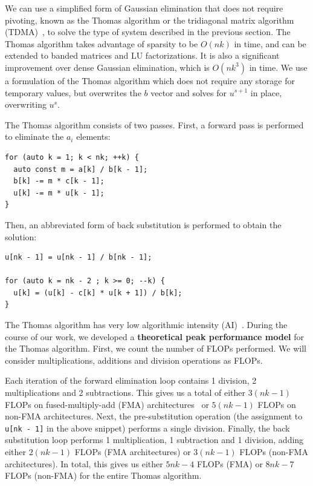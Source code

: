 \documentclass[10pt, conference, compsocconf]{IEEEtran}
\begin{document}
We can use a simplified form of Gaussian elimination that does not require
  pivoting, known as the Thomas algorithm or the tridiagonal matrix algorithm
  (TDMA)~\cite{elem_numerical_analysis_conte,numerical_math_quarteroni}, to
  solve the type of system described in the previous section.
The Thomas algorithm takes advantage of sparsity to be \(O(nk)\) in time, 
  and can be extended to banded matrices and LU factorizations.
It is also a significant improvement over dense Gaussian elimination,
  which is \(O(nk^3)\) in time. 
We use a formulation of the Thomas algorithm which does not require any storage
  for temporary values, but overwrites the \(b\) vector and solves for
  \(u^{s+1}\) in place, overwriting \(u^{s}\).

The Thomas algorithm consists of two passes.  First, a forward pass is
  performed to eliminate the \(a_i\) elements:
\begin{lstlisting}
for (auto k = 1; k < nk; ++k) {
  auto const m = a[k] / b[k - 1];
  b[k] -= m * c[k - 1];
  u[k] -= m * u[k - 1];
} 
\end{lstlisting}
Then, an abbreviated form of back substitution is performed to obtain the
  solution:
\begin{lstlisting}
u[nk - 1] = u[nk - 1] / b[nk - 1];

for (auto k = nk - 2 ; k >= 0; --k) {
  u[k] = (u[k] - c[k] * u[k + 1]) / b[k];
} 
\end{lstlisting}

The Thomas algorithm has very low algorithmic intensity (AI)~\cite{roofline}.
During the course of our work, we developed a \textbf{theoretical peak
  performance model} for the Thomas algorithm.
First, we count the number of FLOPs performed.
We will consider multiplications, additions and division operations as FLOPs.

Each iteration of the forward elimination loop contains 1 division, 2
  multiplications and 2 subtractions.
This gives us a total of either \(3(nk-1)\) FLOPs on fused-multiply-add (FMA)
  architectures~\cite{intel_sw_dev_manual_2c} or 
  \(5(nk-1)\) FLOPs on non-FMA architectures.
Next, the pre-substitution operation (the assignment to \lstinline{u[nk - 1]}
  in the above snippet) performs a single division.
Finally, the back substitution loop performs 1 multiplication, 1
  subtraction and 1 division, adding either \(2(nk-1)\) FLOPs (FMA architectures)
  or \(3(nk-1)\) FLOPs (non-FMA architectures).
In total, this gives us either \(5nk-4\) FLOPs (FMA) or \(8nk-7\) FLOPs
  (non-FMA) for the entire Thomas algorithm.
\end{document}

